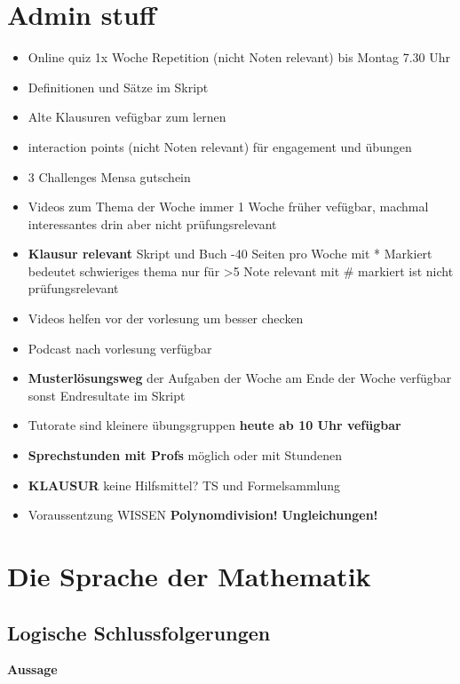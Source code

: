 
\section{Admin stuff}
\begin{itemize}
    \item Online quiz 1x Woche Repetition (nicht Noten relevant) bis Montag 7.30 Uhr
    \item Definitionen und Sätze im Skript
    \item Alte Klausuren vefügbar zum lernen
    \item interaction points (nicht Noten relevant) für engagement und übungen
    \item 3 Challenges Mensa gutschein 
    \item Videos zum Thema der Woche immer 1 Woche früher vefügbar, machmal interessantes drin aber nicht prüfungsrelevant
    \item \textbf{Klausur relevant} Skript und Buch
    -40 Seiten pro Woche
    \subitem mit * Markiert bedeutet schwieriges thema nur für >5 Note relevant
    \subitem mit \# markiert ist nicht prüfungsrelevant
    \item Videos helfen vor der vorlesung um besser checken 
    \item Podcast nach vorlesung verfügbar
    \item \textbf{Musterlösungsweg} der Aufgaben der Woche am Ende der Woche verfügbar
    \subitem sonst Endresultate im Skript
    \item Tutorate sind kleinere übungsgruppen \textbf{heute ab 10 Uhr vefügbar}
    \item \textbf{Sprechstunden mit Profs} möglich oder mit Stundenen
    \item \textbf{KLAUSUR}
    \subitem keine Hilfsmittel? TS und Formelsammlung
    \item Voraussentzung WISSEN
    \subitem \textbf{Polynomdivision!} 
    \subitem \textbf{Ungleichungen!}
\end{itemize}

\section{Die Sprache der Mathematik}

\subsection{Logische Schlussfolgerungen}
\textbf{Aussage}

